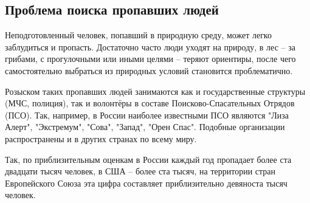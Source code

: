 \subsection{Проблема поиска пропавших людей}\label{sect-1}

Неподготовленный человек, попавший в природную среду, может легко заблудиться и пропасть. Достаточно часто люди уходят на природу, в лес -- за грибами, с прогулочными или иными целями -- теряют ориентиры, после чего самостоятельно выбраться из природных условий становится проблематично.

Розыском таких пропавших людей занимаются как и государственные структуры (МЧС, полиция), так и волонтёры в составе Поисково-Спасательных Отрядов (ПСО). Так, например, в России наиболее известными ПСО являются "Лиза Алерт", "Экстремум", "Сова", "Запад", "Орен Спас". Подобные организации распространены и в других странах по всему миру.

Так, по приблизительным оценкам в России каждый год пропадает более ста двадцати тысяч человек, в США -- более ста тысяч, на территории стран Европейского Союза эта цифра составляет приблизительно девяноста тысяч человек.



